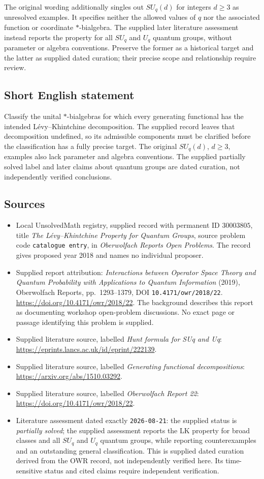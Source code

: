 \documentclass[11pt]{article}
\begin{document}
The original wording additionally singles out \(SU_q(d)\) for integers \(d\geq3\) as unresolved examples. It specifies neither the allowed values of \(q\) nor the associated function or coordinate \(*\)-bialgebra. The supplied later literature assessment instead reports the property for all \(SU_q\) and \(U_q\) quantum groups, without parameter or algebra conventions. Preserve the former as a historical target and the latter as supplied dated curation; their precise scope and relationship require review.
\subsection{Short English statement}
Classify the unital \(*\)-bialgebras for which every generating functional has the intended L\'evy--Khintchine decomposition. The supplied record leaves that decomposition undefined, so its admissible components must be clarified before the classification has a fully precise target. The original \(SU_q(d)\), \(d\geq3\), examples also lack parameter and algebra conventions. The supplied partially solved label and later claims about quantum groups are dated curation, not independently verified conclusions.
\subsection{Sources}
\begin{itemize}
\item Local UnsolvedMath registry, supplied record with permanent ID \(30003805\), title \emph{The L\'evy--Khintchine Property for Quantum Groups}, source problem code \texttt{catalogue entry}, in \emph{Oberwolfach Reports Open Problems}. The record gives proposed year 2018 and names no individual proposer.
\item Supplied report attribution: \emph{Interactions between Operator Space Theory and Quantum Probability with Applications to Quantum Information} (2019), Oberwolfach Reports, pp.\ 1293--1379, DOI \texttt{10.4171/owr/2018/22}. \url{https://doi.org/10.4171/owr/2018/22}. The background describes this report as documenting workshop open-problem discussions. No exact page or passage identifying this problem is supplied.
\item Supplied literature source, labelled \emph{Hunt formula for SUq and Uq}: \url{https://eprints.lancs.ac.uk/id/eprint/222139}.
\item Supplied literature source, labelled \emph{Generating functional decompositions}: \url{https://arxiv.org/abs/1510.03292}.
\item Supplied literature source, labelled \emph{Oberwolfach Report 22}: \url{https://doi.org/10.4171/owr/2018/22}.
\item Literature assessment dated exactly \texttt{2026-08-21}: the supplied status is \emph{partially solved}; the supplied assessment reports the LK property for broad classes and all \(SU_q\) and \(U_q\) quantum groups, while reporting counterexamples and an outstanding general classification. This is supplied dated curation derived from the OWR record, not independently verified here. Its time-sensitive status and cited claims require independent verification.
\end{itemize}
\end{document}
